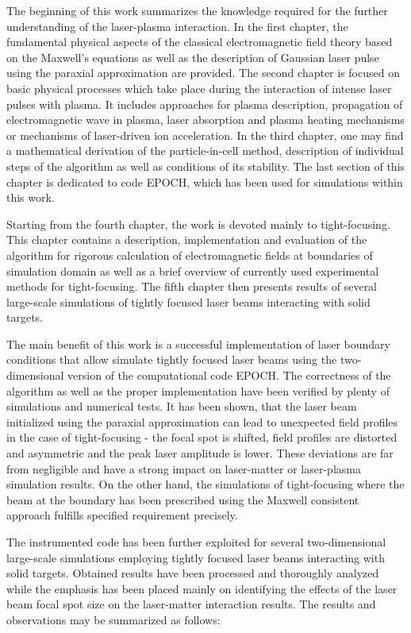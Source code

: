 The beginning of this work summarizes the knowledge required for the further understanding of the laser-plasma interaction. In the first chapter, the fundamental physical aspects of the classical electromagnetic field theory based on the Maxwell's equations as well as the description of Gaussian laser pulse using the paraxial approximation are provided. The second chapter is focused on basic physical processes which take place during the interaction of intense laser pulses with plasma. It includes approaches for plasma description, propagation of electromagnetic wave in plasma, laser absorption and plasma heating mechanisms or mechanisms of laser-driven ion acceleration. In the third chapter, one may find a mathematical derivation of the particle-in-cell method, description of individual steps of the algorithm as well as conditions of its stability. The last section of this chapter is dedicated to code EPOCH, which has been used for simulations within this work. 

Starting from the fourth chapter, the work is devoted mainly to tight-focusing. This chapter contains a description, implementation and evaluation of the algorithm for rigorous calculation of electromagnetic fields at boundaries of simulation domain as well as a brief overview of currently used experimental methods for tight-focusing. The fifth chapter then presents results of several large-scale simulations of tightly focused laser beams interacting with solid targets.

The main benefit of this work is a successful implementation of laser boundary conditions that allow simulate tightly focused laser beams using the two-dimensional version of the computational code EPOCH. The correctness of the algorithm as well as the proper implementation have been verified by plenty of simulations and numerical tests. It has been shown, that the laser beam initialized using the paraxial approximation can lead to unexpected field profiles in the case of tight-focusing - the focal spot is shifted, field profiles are distorted and asymmetric and the peak laser amplitude is lower. These deviations are far from negligible and have a strong impact on laser-matter or laser-plasma simulation results. On the other hand, the simulations of tight-focusing where the beam at the boundary has been prescribed using the Maxwell consistent approach fulfills specified requirement precisely.

The instrumented code has been further exploited for several two-dimensional large-scale simulations employing tightly focused laser beams interacting with solid targets. Obtained results have been processed and thoroughly analyzed while the emphasis has been placed mainly on identifying the effects of the laser beam focal spot size on the laser-matter interaction results. The results and observations may be summarized as follows:


